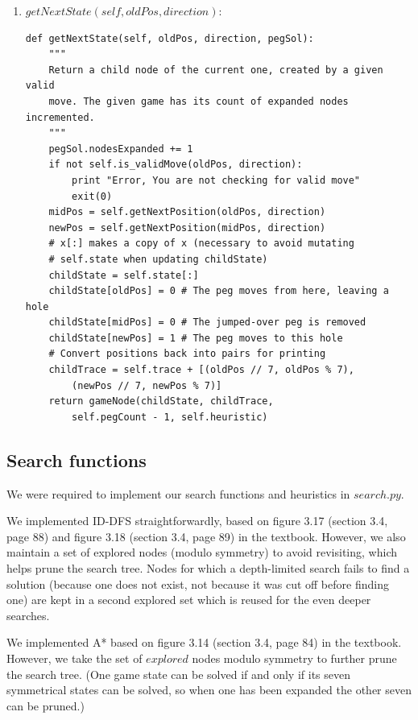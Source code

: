 \documentclass[11pt]{article}
\begin{document}
\begin{enumerate}
\item \(getNextState(self, oldPos, direction)\):

\lstset{language=Python}
\begin{lstlisting}[frame=single]
def getNextState(self, oldPos, direction, pegSol):
	"""
	Return a child node of the current one, created by a given valid
	move. The given game has its count of expanded nodes incremented.
	"""
	pegSol.nodesExpanded += 1
	if not self.is_validMove(oldPos, direction):
		print "Error, You are not checking for valid move"
		exit(0)
	midPos = self.getNextPosition(oldPos, direction)
	newPos = self.getNextPosition(midPos, direction)
	# x[:] makes a copy of x (necessary to avoid mutating
	# self.state when updating childState)
	childState = self.state[:]
	childState[oldPos] = 0 # The peg moves from here, leaving a hole
	childState[midPos] = 0 # The jumped-over peg is removed
	childState[newPos] = 1 # The peg moves to this hole
	# Convert positions back into pairs for printing
	childTrace = self.trace + [(oldPos // 7, oldPos % 7),
		(newPos // 7, newPos % 7)]
	return gameNode(childState, childTrace,
		self.pegCount - 1, self.heuristic)
\end{lstlisting}

\end{enumerate}

\subsection{Search functions}

We were required to implement our search functions and heuristics in
\(search.py\).

We implemented ID-DFS straightforwardly, based on figure 3.17 (section 3.4,
page 88) and figure 3.18 (section 3.4, page 89) in the textbook. However, we
also maintain a set of explored nodes (modulo symmetry) to avoid revisiting,
which helps prune the search tree. Nodes for which a depth-limited search
fails to find a solution (because one does not exist, not because it was cut
off before finding one) are kept in a second explored set which is reused
for the even deeper searches.

We implemented A* based on figure 3.14 (section 3.4, page 84) in the textbook.
However, we take the set of \(explored\) nodes modulo symmetry to further prune
the search tree. (One game state can be solved if and only if its seven
symmetrical states can be solved, so when one has been expanded the other
seven can be pruned.)
\end{document}
